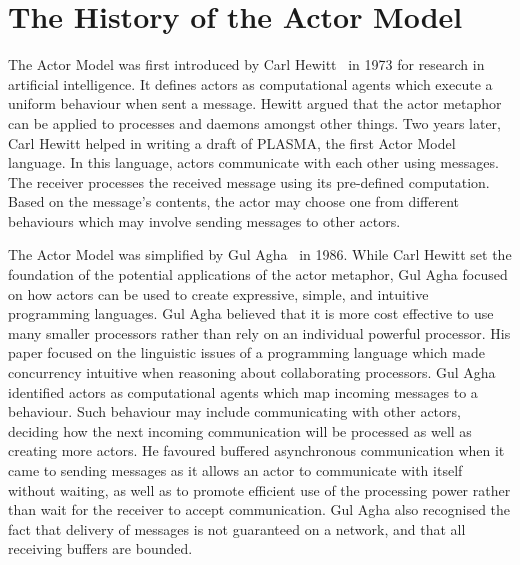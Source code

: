 \documentclass[12pt, a4paper]{report}
\theoremstyle{definition}
\theoremstyle{definition}%
\theoremstyle{definition}%
\theoremstyle{definition}%
\theoremstyle{definition}%
\theoremstyle{definition}%
\begin{document}
\section{The History of the Actor Model}
The Actor Model was first introduced by Carl Hewitt~\cite{hewitt1973session}\cite{43years} in 1973 for research in artificial intelligence. It defines actors as computational agents which execute a uniform behaviour when sent a message. Hewitt argued that the actor metaphor can be applied to processes and daemons amongst other things. Two years later, Carl Hewitt helped in writing a draft of PLASMA, the first Actor Model language. In this language, actors communicate with each other using messages. The receiver processes the received message using its pre-defined computation. Based on the message’s contents, the actor may choose one from different behaviours which may involve sending messages to other actors.

The Actor Model was simplified by Gul Agha~\cite{agha1985actors} in 1986. While Carl Hewitt set the foundation of the potential applications of the actor metaphor, Gul Agha focused on how actors can be used to create expressive, simple, and intuitive programming languages. Gul Agha believed that it is more cost effective to use many smaller processors rather than rely on an individual powerful processor. His paper focused on the linguistic issues of a programming language which made concurrency intuitive when reasoning about collaborating processors. Gul Agha identified actors as computational agents which map incoming messages to a behaviour. Such behaviour may include communicating with other actors, deciding how the next incoming communication will be processed as well as creating more actors. He favoured buffered asynchronous communication when it came to sending messages as it allows an actor to communicate with itself without waiting, as well as to promote efficient use of the processing power rather than wait for the receiver to accept communication. Gul Agha also recognised the fact that delivery of messages is not guaranteed on a network, and that all receiving buffers are bounded.
\end{document}
